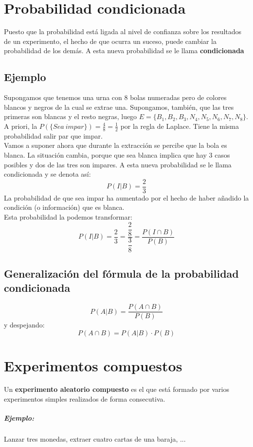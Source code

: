 \section{Probabilidad condicionada}

Puesto que la probabilidad está ligada al nivel de confianza sobre los resultados de un experimento, el hecho de que ocurra un suceso, puede cambiar la probabilidad de los demás. A esta nueva probabilidad se le llama \textbf{condicionada}
\subsection{Ejemplo}
 Supongamos que tenemos una urna con 8 bolas numeradas pero de colores blancos y negros de la cual se extrae una. Supongamos, también, que las tres primeras son blancas y el resto negras, luego  $E=\lbrace B_1,B_2, B_3, N_4, N_5, N_6, N_7, N_8\rbrace$.\\
 A priori, la $P(\lbrace Sea\ impar\rbrace )=\frac{4}{8}=\frac{1}{2}$ por la regla de Laplace. Tiene la misma probabilidad salir par que impar.\\
 
 Vamos a suponer ahora que durante la extracción se percibe que la bola es blanca. La situación cambia, porque que sea blanca implica que hay 3 casos posibles y dos de las tres son impares. A esta nueva probabilidad se le llama  condicionada y se denota así:
 $$P(I|B)=\dfrac{2}{3}$$
La probabilidad de que sea impar ha aumentado por el hecho de haber añadido la condición (o información) que es blanca.\\
Esta probabilidad la podemos transformar:
 $$P(I|B)=\dfrac{2}{3}=\dfrac{\dfrac{2}{8}}{\dfrac{3}{8}}=\dfrac{P(I\cap B)}{P(B)}$$

\subsection{Generalización del fórmula de la probabilidad condicionada} $$P(A|B)=\dfrac{P(A\cap B)}{P(B)}$$
y despejando:
$$P(A\cap B) = P(A|B)\cdot P(B)$$

\section{Experimentos compuestos} Un \textbf{experimento aleatorio compuesto} es el que está formado por varios experimentos simples realizados de forma consecutiva.
\subparagraph{Ejemplo:}Lanzar tres monedas, extraer cuatro cartas de una baraja, ...

